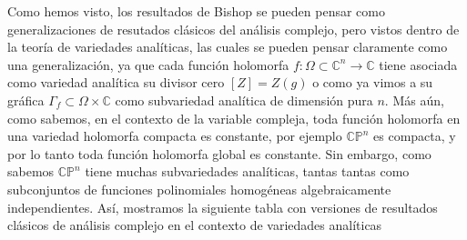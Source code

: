 \documentclass[letterpaper]{report}
\newcommand{\co}{\ensuremath{\mathbb C }}
\newcommand{\con}{\ensuremath{\mathbb{C}^n}}
\newcommand{\cp}{\ensuremath{\mathbb{CP}}}
\begin{document}
Como hemos visto, los resultados de Bishop se pueden pensar como generalizaciones de resutados cl\'asicos del an\'alisis complejo,
pero vistos dentro de la teor\'ia de variedades anal\'iticas, las cuales se pueden pensar claramente como una generalizaci\'on, 
ya que cada funci\'on holomorfa $f:\Omega\subset\con\rightarrow\co$ tiene asociada como variedad anal\'itica su divisor cero $[Z]=Z(g)$
o como ya vimos a su gr\'afica $\Gamma_{f}\subset\Omega\times\co$ como subvariedad anal\'itica de dimensi\'on pura $n$. M\'as a\'un, como sabemos, en el contexto
de la variable compleja, toda funci\'on holomorfa en una variedad holomorfa compacta es constante, por ejemplo $\cp^n$ es compacta,
y por lo tanto toda funci\'on holomorfa global es constante. Sin embargo, como sabemos $\cp^n$ tiene muchas subvariedades anal\'iticas, tantas
tantas como subconjuntos de funciones polinomiales homog\'eneas algebraicamente independientes. As\'i, mostramos la siguiente tabla con
versiones de resultados cl\'asicos de an\'alisis complejo en el contexto de variedades anal\'iticas 
\\      
\label{table_complex_analysis} 
\end{document}
